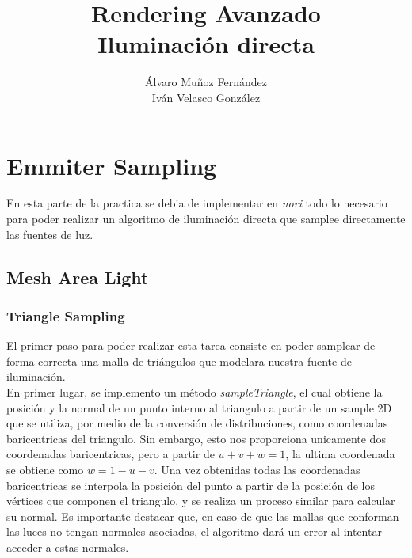 \documentclass[10pt,oneside,a4paper]{article}
\begin{document}
\begin{titlepage}

\title{\Huge Rendering Avanzado  \\[0.7in] \LARGE Iluminación directa\\[3.6in]}
\date{}
\author{Álvaro Muñoz Fernández\\
Iván Velasco González}
\maketitle
\thispagestyle{empty}
\end{titlepage}

\section{Emmiter Sampling}
En esta parte de la practica se debia de implementar en \textit{nori} todo lo necesario para poder realizar un algoritmo de iluminación directa que samplee directamente las fuentes de luz.
\subsection{Mesh Area Light}
\subsubsection{Triangle Sampling}
El primer paso para poder realizar esta tarea consiste en poder samplear de forma correcta una malla de triángulos que modelara nuestra fuente de iluminación.\\

En primer lugar, se implemento un método \textit{sampleTriangle}, el cual obtiene la posición y la normal de un punto interno al triangulo a partir de un sample 2D que se utiliza, por medio de la conversión de distribuciones, como coordenadas baricentricas del triangulo. Sin embargo, esto nos proporciona unicamente dos coordenadas baricentricas, pero a partir de $ u + v + w = 1$, la ultima coordenada se obtiene como $ w = 1 - u - v$. Una vez obtenidas todas las coordenadas baricentricas se interpola la posición del punto a partir de la posición de los vértices que componen el triangulo, y se realiza un proceso similar para calcular su normal. Es importante destacar que, en caso de que las mallas que conforman las luces no tengan normales asociadas, el algoritmo dará un error al intentar acceder a estas normales.\\
\end{document}
